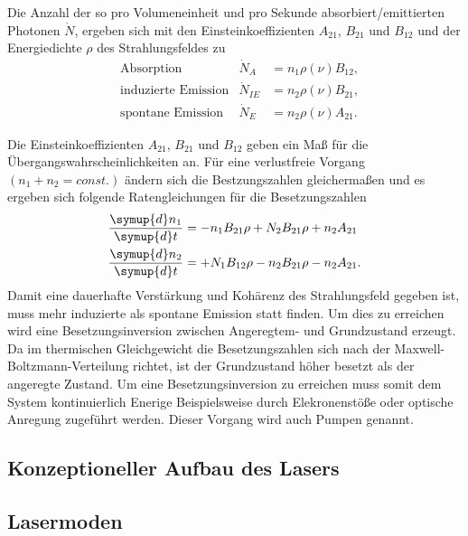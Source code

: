 Die Anzahl der so
pro Volumeneinheit und pro Sekunde
absorbiert/emittierten Photonen $\dot{N}$,
ergeben sich mit den Einsteinkoeffizienten $A_21$, $B_21$ und $B_12$
und der Energiedichte $\rho$ des Strahlungsfeldes zu
\begin{align}
& \text{Absorption}   &\dot{N}_A   &= n_1 \rho(\nu)B_{12},\\
& \text{induzierte Emission}   &\dot{N}_{IE}&= n_2 \rho(\nu)B_{21},\\
& \text{spontane Emission}   &\dot{N}_E   &= n_2 \rho(\nu) A_{21}.
\end{align}

Die Einsteinkoeffizienten $A_21$, $B_21$ und $B_12$
geben ein Maß für die Übergangswahrscheinlichkeiten an.
Für eine verlustfreie Vorgang
$(n_1+n_2=const.)$ ändern sich die Bestzungszahlen
gleichermaßen und es ergeben sich folgende
Ratengleichungen für die Besetzungszahlen
\begin{align}
\frac{\symup{d} n_1}{\symup{d} t} &=-n_1 B_{21}\rho + N_2 B_{21} \rho + n_2 A_{21}\\
\frac{\symup{d} n_2}{\symup{d} t} &=+N_1 B_{12}\rho - n_2 B_{21} \rho - n_2 A_{21}.
\end{align}
Damit eine dauerhafte Verstärkung
und Kohärenz des Strahlungsfeld gegeben ist,
muss mehr induzierte als spontane Emission
statt finden. Um dies zu
erreichen wird eine Besetzungsinversion
zwischen Angeregtem- und Grundzustand
erzeugt.
Da im thermischen Gleichgewicht
die Besetzungszahlen sich nach der
Maxwell-Boltzmann-Verteilung
richtet, ist der Grundzustand höher
besetzt als der angeregte Zustand.
Um eine Besetzungsinversion zu erreichen
muss somit dem System kontinuierlich
Enerige Beispielsweise durch
Elekronenstöße oder
optische Anregung zugeführt werden.
Dieser Vorgang wird auch Pumpen genannt.



\subsection{Konzeptioneller Aufbau des Lasers}
\label{subsec:konzeptioneller_aufbau}


\subsection{Lasermoden}
\label{subsec:lasermoden}
